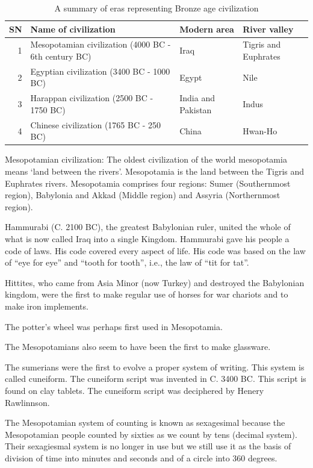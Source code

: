 \documentclass[
  openany]{book}
\begin{document}
\begin{table}

\caption{\label{tab:bronze-age}A summary of eras representing Bronze age civilization}
\centering
\begin{tabular}[t]{rlll}
\toprule
SN & Name of civilization & Modern area & River valley\\
\midrule
1 & Mesopotamian civilization (4000 BC - 6th century BC) & Iraq & Tigris and Euphrates\\
2 & Egyptian civilization (3400 BC - 1000 BC) & Egypt & Nile\\
3 & Harappan civilization (2500 BC - 1750 BC) & India and Pakistan & Indus\\
4 & Chinese civilization (1765 BC - 250 BC) & China & Hwan-Ho\\
\bottomrule
\end{tabular}
\end{table}

Mesopotamian civilization: The oldest civilization of the world mesopotamia means `land between the rivers'. Mesopotamia is the land between the Tigris and Euphrates rivers. Mesopotamia comprises four regions: Sumer (Southernmost region), Babylonia and Akkad (Middle region) and Assyria (Northernmost region).

Hammurabi (C. 2100 BC), the greatest Babylonian ruler, united the whole of what is now called Iraq into a single Kingdom. Hammurabi gave his people a code of laws. His code covered every aspect of life. His code was based on the law of ``eye for eye'' and ``tooth for tooth'', i.e., the law of ``tit for tat''.

Hittites, who came from Asia Minor (now Turkey) and destroyed the Babylonian kingdom, were the first to make regular use of horses for war chariots and to make iron implements.

The potter's wheel was perhaps first used in Mesopotamia.

The Mesopotamians also seem to have been the first to make glassware.

The sumerians were the first to evolve a proper system of writing. This system is called cuneiform. The cuneiform script was invented in C. 3400 BC. This script is found on clay tablets. The cuneiform script was deciphered by Henery Rawlinnson.

The Mesopotamian system of counting is known as sexagesimal because the Mesopotamian people counted by sixties as we count by tens (decimal system). Their sexagiesmal system is no longer in use but we still use it as the basis of division of time into minutes and seconds and of a circle into 360 degrees.
\end{document}
